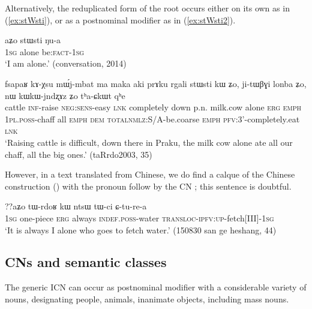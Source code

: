 Alternatively, the reduplicated form of the root  occurs either on its own as in (\ref{ex:stWsti}), or as a postnominal modifier as in (\ref{ex:stWsti2}).

\begin{exe}
\ex \label{ex:stWsti}
\gll aʑo stɯsti ŋu-a \\
\textsc{1sg} alone be:\textsc{fact}-\textsc{1sg} \\
\glt `I am alone.' (conversation, 2014)
\end{exe}

\begin{exe}
\ex \label{ex:stWsti2}
\gll  fsapaʁ kɤ-χsu mɯ́j-mbat ma maka aki prɤku rgali stɯsti kɯ ʑo, ji-tɯβɣi lonba ʑo, nɯ kɯ\redp{}kɯ-jndʐɤz ʑo tʰa-ɕkɯt qʰe \\
cattle \textsc{inf}-raise \textsc{neg}:\textsc{sens}-easy \textsc{lnk} completely down p.n. milk.cow alone \textsc{erg} \textsc{emph} \textsc{1pl}.\textsc{poss}-chaff all \textsc{emph} \textsc{dem} \textsc{total}\redp{}\textsc{nmlz}:S/A-be.coarse \textsc{emph} \textsc{pfv}:3'-completely.eat \textsc{lnk} \\
\glt `Raising cattle is difficult, down there in Praku, the milk cow alone ate all our chaff, all the big ones.' (taRrdo2003, 35)
\end{exe}

However, in a text translated from Chinese, we do find a calque of the Chinese construction () with the pronoun  follow by the CN ; this sentence is doubtful.

\begin{exe}
\ex \label{ex:stWsti2}
\gll  ??aʑo tɯ-rdoʁ kɯ ntsɯ tɯ-ci ɕ-tu-re-a \\
\textsc{1sg} one-piece \textsc{erg} always \textsc{indef}.\textsc{poss}-water \textsc{transloc}-\textsc{ipfv}:\textsc{up}-fetch[III]-\textsc{1sg} \\
\glt `It is always I alone who goes to fetch water.' (150830 san ge heshang, 44)
\end{exe}

\subsection{CNs and semantic classes} \label{sec:CN.classification}
The generic ICN  can occur as postnominal modifier with a considerable variety of nouns, designating people, animals, inanimate objects, including mass nouns.

